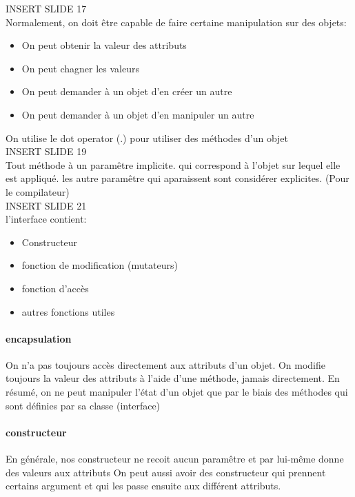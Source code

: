 \documentclass[oneside]{book}
\begin{document}
INSERT SLIDE 17\\

Normalement, on doit être capable de faire certaine manipulation sur des objets:
\begin{itemize}
\item On peut obtenir la valeur des attributs
\item On peut chagner les valeurs
\item On peut demander à un objet d'en créer un autre
\item On peut demander à un objet d'en manipuler un autre
\end{itemize}

On utilise le dot operator (.) pour utiliser des méthodes d'un objet\\

INSERT SLIDE 19\\


Tout méthode à un paramêtre implicite. qui correspond à l'objet sur lequel elle est appliqué. les autre paramêtre qui aparaissent sont considérer explicites. (Pour le compilateur)\\

INSERT SLIDE 21\\

l'interface contient:
\begin{itemize}
\item Constructeur
\item fonction de modification (mutateurs)
\item fonction d'accès
\item autres fonctions utiles
\end{itemize}

\paragraph{encapsulation}
On n'a pas toujours accès directement aux attributs d'un objet. On modifie toujours la valeur des attributs à l'aide d'une méthode, jamais directement. En résumé, on ne peut manipuler l’état d’un objet que par le biais des méthodes qui sont définies par sa classe (interface)\\

\paragraph{constructeur}
En générale, nos constructeur ne recoit aucun paramêtre et par lui-même donne des valeurs aux attributs On peut aussi avoir des constructeur qui prennent certains argument et qui les passe ensuite aux différent attributs.\\
\end{document}
